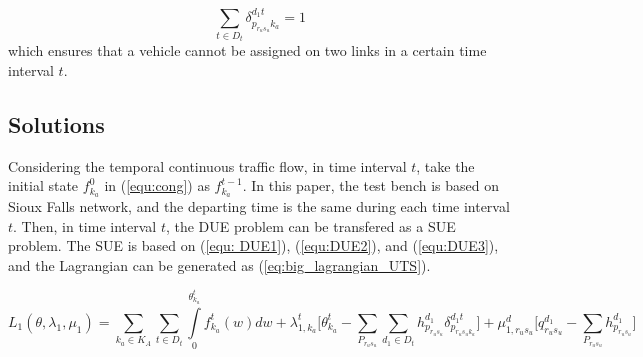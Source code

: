 \documentclass[final]{IEEEtran}
\begin{document}
\begin{equation}\label{equ:sum}
\sum_{t\in D_t}\delta^{d_1t}_{p_{r_us_u}k_a} = 1
\end{equation} 
which ensures that a vehicle cannot be assigned on two links in a certain time interval $t$.

\subsection{Solutions}
Considering the temporal continuous traffic flow, in time interval $t$, take the initial state $f^0_{k_a}$ in (\ref{equ:cong}) as $f^{t-1}_{k_a}$. In this paper, the test bench is based on Sioux Falls network, and the departing time is the same during each time interval $t$. Then, in time interval $t$, the DUE problem can be transfered as a SUE problem. The SUE is based on (\ref{equ: DUE1}), (\ref{equ:DUE2}), and (\ref{equ:DUE3}), and the Lagrangian can be generated as (\ref{eq:big_lagrangian_UTS}).    
\begin{figure*}[!t]
	\begin{equation}\label{eq:big_lagrangian_UTS}
	 L_{1}(\theta,\lambda_1,\mu_1) = \sum_{k_a\in K_A}\sum_{t\in D_t} \int\limits^{\theta^t_{k_a}}_{0}f^t_{k_a}(w)dw +
	 \lambda^t_{1,k_a}\bigg[\theta^t_{k_a} - \sum_{ P_{r_us_u}}\sum_{d_1\in D_t} h^{d_1}_{p_{r_us_u}} \delta^{d_1t}_{p_{r_us_uk_a}}\bigg] + \mu^d_{1,r_us_u} \bigg[q^{d_1}_{r_us_u} - \sum_{ P_{r_us_u}} h^{d_1}_{p_{r_us_u}}\bigg]
	\end{equation}
	\vspace*{0.0in}
\end{figure*}
\end{document}

